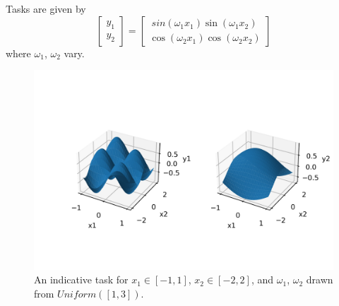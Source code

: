 Tasks are given by 
\begin{equation}
	\begin{bmatrix}
		y_1\\y_2
	\end{bmatrix}
	= 	\begin{bmatrix}
		\ sin(\omega_1 x_1) \sin(\omega_1 x_2)\\ \cos(\omega_2 x_1) \cos(\omega_2 x_2)
	\end{bmatrix}
\end{equation}
where $\omega_1$, $\omega_2$ vary.
\begin{figure}[H]
	\centering
	\includegraphics[width=1\linewidth]{./figs/sincos_product_functions.png}  
	\caption{An indicative task for $x_1 \in [-1, 1]$, $x_2 \in [-2, 2]$, and $\omega_1$, $\omega_2$ drawn from $Uniform([1,3])$.}
	\label{}
\end{figure}


\newpage	
\printbibliography[heading=bibintoc,title={References}]
	
